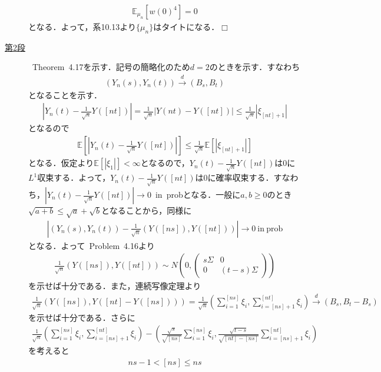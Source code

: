 \documentclass[dvipdfmx]{jsarticle}
\def\qed{\hfill $\Box$}
\begin{document}
\begin{description}
\begin{align*}
\mathbb{E}_{\mu_n}[w(0)^4]=0
\end{align*}
となる．よって，系10.13より$\{\mu_n\}$はタイトになる．\qed
\item[\underline{第2段}]
\cite{KS}{\ }Theorem{\ }4.17を示す．記号の簡略化のため$d=2$のときを示す．すなわち
\begin{align*}
(Y_n(s),Y_n(t))\overset{d}{\to}(B_s,B_t)
\end{align*}
となることを示す．
\begin{align*}
\left|Y_n(t)-\frac{1}{\sqrt{n}}Y([nt])\right|=\frac{1}{\sqrt{n}}|Y(nt)-Y([nt])|\leq \frac{1}{\sqrt{n}}|\xi_{[nt]+1}|
\end{align*}
となるので
\begin{align*}
\mathbb{E}\left[\left|Y_n(t)-\frac{1}{\sqrt{n}}Y([nt])\right|\right]\leq \frac{1}{\sqrt{n}}\mathbb{E}[|\xi_{[nt]+1}|]
\end{align*}
となる．仮定より$\mathbb{E}[|\xi_1|]<\infty$となるので，$Y_n(t)-\frac{1}{\sqrt{n}}Y([nt])$は$0$に$L^1$収束する．よって，$Y_n(t)-\frac{1}{\sqrt{n}}Y([nt])$は$0$に確率収束する．すなわち，$\left|Y_n(t)-\frac{1}{\sqrt{n}}Y([nt])\right|\to 0${\ }in{\ }probとなる．一般に$a,b\geq 0$のとき$\sqrt{a+b}\leq \sqrt{a}+\sqrt{b}$となることから，同様に
\begin{align*}
\left|(Y_n(s),Y_n(t))-\frac{1}{\sqrt{n}}(Y([ns]),Y([nt]))\right|\to 0 {\ }\mathrm{in{\ }prob}
\end{align*}
となる．よって\cite{KS}{\ }Problem{\ }4.16より
\begin{align*}
\frac{1}{\sqrt{n}}(Y([ns]),Y([nt]))\sim N\left(0,
\begin{pmatrix}
s\Sigma & 0 \\
0 & (t-s)\Sigma
\end{pmatrix}
\right)
\end{align*}
を示せば十分である．また，連続写像定理より
\begin{align*}
\frac{1}{\sqrt{n}}(Y([ns]),Y([nt]-Y([ns])))
=\frac{1}{\sqrt{n}}\left(\sum_{i=1}^{[ns]}\xi_i,\sum_{i=[ns]+1}^{[nt]}\xi_i\right)
\overset{d}{\to}(B_s,B_t-B_s)
\end{align*}
を示せば十分である．さらに
\begin{align*}
\frac{1}{\sqrt{n}}\left(\sum_{i=1}^{[ns]}\xi_i,\sum_{i=[ns]+1}^{[nt]}\xi_i\right)
-\left(\frac{\sqrt{s}}{\sqrt{[ns]}}\sum_{i=1}^{[ns]}\xi_i,\frac{\sqrt{t-s}}{\sqrt{[nt]-[ns]}}\sum_{i=[ns]+1}^{[nt]}\xi_i\right)
\end{align*}
を考えると
\begin{align*}
ns-1<[ns]\leq ns
\end{align*}

\end{description}
\end{document}
